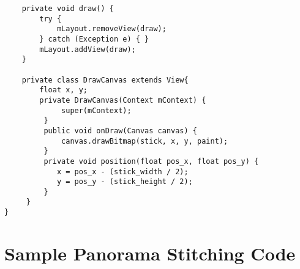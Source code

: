 \begin{lstlisting}
    private void draw() {
        try {
            mLayout.removeView(draw);
        } catch (Exception e) { }
        mLayout.addView(draw);
    }
     
    private class DrawCanvas extends View{
        float x, y;
        private DrawCanvas(Context mContext) {
             super(mContext);
         }
         public void onDraw(Canvas canvas) {
             canvas.drawBitmap(stick, x, y, paint);
         }
         private void position(float pos_x, float pos_y) {
            x = pos_x - (stick_width / 2);
            y = pos_y - (stick_height / 2);
         }
     }
}
\end{lstlisting}       
\section{Sample Panorama Stitching Code}
